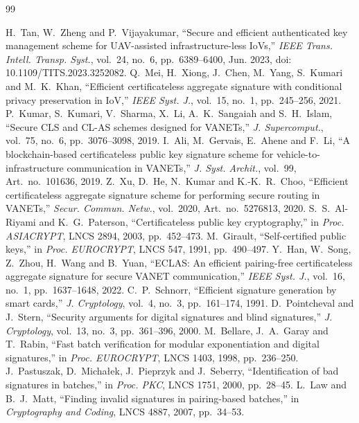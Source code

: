 \begin{thebibliography}{99}\small
{}
 H.~Tan, W.~Zheng and P.~Vijayakumar, ``Secure and efficient authenticated key management scheme for UAV-assisted infrastructure-less IoVs,''
  \emph{IEEE Trans. Intell. Transp. Syst.}, vol.~24, no.~6, pp.~6389--6400, Jun. 2023, doi: 10.1109/TITS.2023.3252082.
 Q.~Mei, H.~Xiong, J.~Chen, M.~Yang, S.~Kumari and M.~K.~Khan, ``Efficient certificateless aggregate signature with conditional privacy
  preservation in IoV,'' \emph{IEEE Syst. J.}, vol.~15, no.~1, pp.~245--256, 2021.
 P.~Kumar, S.~Kumari, V.~Sharma, X.~Li, A.~K.~Sangaiah and S.~H.~Islam, ``Secure CLS and CL-AS schemes designed for VANETs,''
  \emph{J. Supercomput.}, vol.~75, no.~6, pp.~3076--3098, 2019.
 I.~Ali, M.~Gervais, E.~Ahene and F.~Li, ``A blockchain-based certificateless public key signature scheme for vehicle-to-infrastructure
  communication in VANETs,'' \emph{J. Syst. Archit.}, vol.~99, Art.~no.~101636, 2019.
 Z.~Xu, D.~He, N.~Kumar and K.-K.~R.~Choo, ``Efficient certificateless aggregate signature scheme for performing secure routing in VANETs,''
  \emph{Secur. Commun. Netw.}, vol.~2020, Art.~no.~5276813, 2020.
 S.~S.~Al-Riyami and K.~G.~Paterson, ``Certificateless public key cryptography,'' in \emph{Proc. ASIACRYPT}, LNCS 2894, 2003, pp.~452--473.
 M.~Girault, ``Self-certified public keys,'' in \emph{Proc. EUROCRYPT}, LNCS 547, 1991, pp.~490--497.
 Y.~Han, W.~Song, Z.~Zhou, H.~Wang and B.~Yuan, ``ECLAS: An efficient pairing-free certificateless aggregate signature for secure VANET
  communication,'' \emph{IEEE Syst. J.}, vol.~16, no.~1, pp.~1637--1648, 2022.
 C.~P.~Schnorr, ``Efficient signature generation by smart cards,'' \emph{J. Cryptology}, vol.~4, no.~3, pp.~161--174, 1991.
 D.~Pointcheval and J.~Stern, ``Security arguments for digital signatures and blind signatures,'' \emph{J. Cryptology}, vol.~13, no.~3,
  pp.~361--396, 2000.
 M.~Bellare, J.~A.~Garay and T.~Rabin, ``Fast batch verification for modular exponentiation and digital signatures,'' in \emph{Proc. EUROCRYPT},
  LNCS 1403, 1998, pp.~236--250.
 J.~Pastuszak, D.~Micha{\l}ek, J.~Pieprzyk and J.~Seberry, ``Identification of bad signatures in batches,'' in \emph{Proc. PKC}, LNCS 1751,
  2000, pp.~28--45.
 L.~Law and B.~J.~Matt, ``Finding invalid signatures in pairing-based batches,'' in \emph{Cryptography and Coding}, LNCS 4887, 2007, pp.~34--53.

\end{thebibliography}

